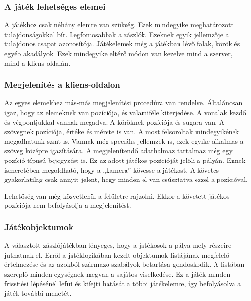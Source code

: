 \documentclass[]{article}
\begin{document}
\hypertarget{a-juxe1tuxe9k-lehetsuxe9ges-elemei}{%
\subsubsection{A játék lehetséges
elemei}\label{a-juxe1tuxe9k-lehetsuxe9ges-elemei}}

A játékhoz csak néhány elemre van szükség. Ezek mindegyike meghatározott
tulajdonságokkal bír. Legfontosabbak a zászlók. Ezeknek egyik jellemzője
a tulajdonos csapat azonosítója. Játékelemek még a játékban lévő falak,
körök és egyéb akadályok. Ezek mindegyike eltérő módon van kezelve mind
a szerver, mind a kliens oldalán.

\hypertarget{megjelenuxedtuxe9s-a-kliens-oldalon}{%
\subsubsection{Megjelenítés a
kliens-oldalon}\label{megjelenuxedtuxe9s-a-kliens-oldalon}}

Az egyes elemekhez más-más megjelenítési procedúra van rendelve.
Általánosan igaz, hogy az elemeknek van pozíciója, és valamiféle
kiterjedése. A vonalak kezdő és végpontjukkal vannak megadva. A köröknek
pozíciója és sugara van. A szövegnek pozíciója, értéke és mérete is van.
A most felsoroltak mindegyikének megadhatunk színt is. Vannak még
speciális jellemzők is, ezek egyike alkalmas a szöveg középre
igazítására. A megjelenítendő adathalmaz tartalmaz még egy pozíció
típusú bejegyzést is. Ez az adott játékos pozícióját jelöli a pályán.
Ennek ismeretében megoldható, hogy a „kamera'' kövesse a játékost. A
követés gyakorlatilag csak annyit jelent, hogy minden el van csúsztatva
ezzel a pozícióval.

Lehetőség van még közvetlenül a felületre rajzolni. Ekkor a követett
játékos pozíciója nem befolyásolja a megjelenítést.

\hypertarget{juxe1tuxe9kobjektumok}{%
\subsubsection{Játékobjektumok}\label{juxe1tuxe9kobjektumok}}

A választott zászlójátékban lényeges, hogy a játékosok a pálya mely
részeire juthatnak el. Erről a játéklogikában kezelt objektumok
listájának megfelelő értelmezése és az azokból származó szabályok
betartása gondoskodik. A listában szereplő minden egységnek megvan a
sajátos viselkedése. Ez a játék minden frissítési lépésénél lefut és
kifejti hatását a többi játékelemre, így befolyásolva a játék további
menetét.
\end{document}
